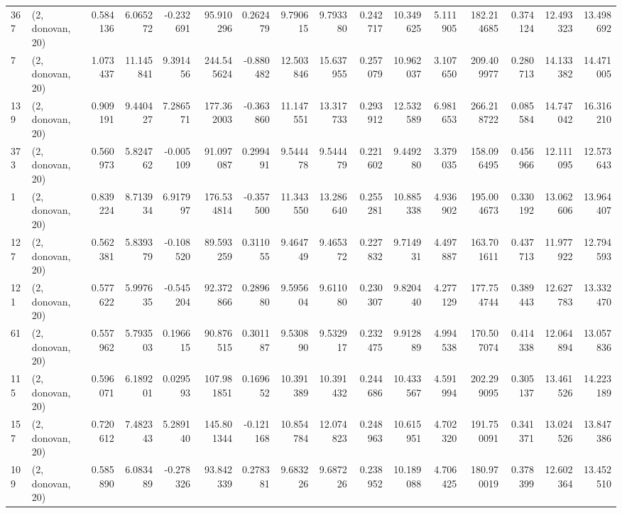 \begin{tabular}{llrrrrrrrrrrrrrr}
367 &  (2, donovan, 20) &   0.584136 &   6.065272 &  -0.232691 &    95.910296 &   0.262479 &   9.790615 &   9.793380 &  0.242717 &  10.349625 &   5.111905 &    182.214685 &    0.374124 &   12.493323 &   13.498692 \\
7   &  (2, donovan, 20) &   1.073437 &  11.145841 &   9.391456 &   244.545624 &  -0.880482 &  12.503846 &  15.637955 &  0.257079 &  10.962037 &   3.107650 &    209.409977 &    0.280713 &   14.133382 &   14.471005 \\
139 &  (2, donovan, 20) &   0.909191 &   9.440427 &   7.286571 &   177.362003 &  -0.363860 &  11.147551 &  13.317733 &  0.293912 &  12.532589 &   6.981653 &    266.218722 &    0.085584 &   14.747042 &   16.316210 \\
373 &  (2, donovan, 20) &   0.560973 &   5.824762 &  -0.005109 &    91.097087 &   0.299491 &   9.544478 &   9.544479 &  0.221602 &   9.449280 &   3.379035 &    158.096495 &    0.456966 &   12.111095 &   12.573643 \\
1   &  (2, donovan, 20) &   0.839224 &   8.713934 &   6.917997 &   176.534814 &  -0.357500 &  11.343550 &  13.286640 &  0.255281 &  10.885338 &   4.936902 &    195.004673 &    0.330192 &   13.062606 &   13.964407 \\
127 &  (2, donovan, 20) &   0.562381 &   5.839379 &  -0.108520 &    89.593259 &   0.311055 &   9.464749 &   9.465372 &  0.227832 &   9.714931 &   4.497887 &    163.701611 &    0.437713 &   11.977922 &   12.794593 \\
121 &  (2, donovan, 20) &   0.577622 &   5.997635 &  -0.545204 &    92.372866 &   0.289680 &   9.595604 &   9.611080 &  0.230307 &   9.820440 &   4.277129 &    177.754744 &    0.389443 &   12.627783 &   13.332470 \\
61  &  (2, donovan, 20) &   0.557962 &   5.793503 &   0.196615 &    90.876515 &   0.301187 &   9.530890 &   9.532917 &  0.232475 &   9.912889 &   4.994538 &    170.507074 &    0.414338 &   12.064894 &   13.057836 \\
115 &  (2, donovan, 20) &   0.596071 &   6.189201 &   0.029593 &   107.981851 &   0.169652 &  10.391389 &  10.391432 &  0.244686 &  10.433567 &   4.591994 &    202.299095 &    0.305137 &   13.461526 &   14.223189 \\
157 &  (2, donovan, 20) &   0.720612 &   7.482343 &   5.289140 &   145.801344 &  -0.121168 &  10.854784 &  12.074823 &  0.248963 &  10.615951 &   4.702320 &    191.750091 &    0.341371 &   13.024526 &   13.847386 \\
109 &  (2, donovan, 20) &   0.585890 &   6.083489 &  -0.278326 &    93.842339 &   0.278381 &   9.683226 &   9.687226 &  0.238952 &  10.189088 &   4.706425 &    180.970019 &    0.378399 &   12.602364 &   13.452510 \\

\end{tabular}
